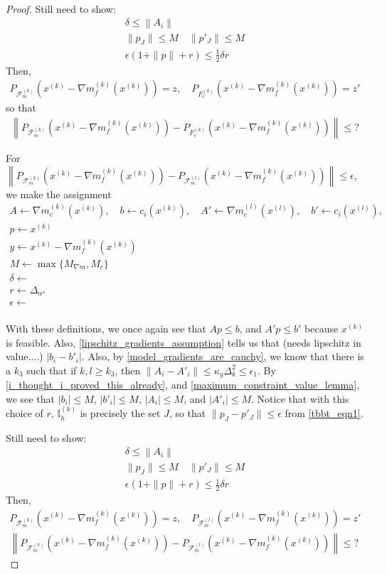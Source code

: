 \documentclass{article}
\theoremstyle{case}
\numberwithin{theorem}{subsection}
\newcommand{\dk}{\Delta_k}
\newcommand{\feasiblek}{{\mathcal F_m^{(k)}}}
\newcommand{\feasiblel}{{\mathcal F_m^{(l)}}}
\newcommand{\gk}{{\nabla m_f^{(k)}\left(\xk\right)}}
\newcommand{\minangledelta}{{\Delta_{\alpha^{\star}}}}
\newcommand{\xk}{x^{(k)}}
\newcommand{\xl}{{x^{(l)}}}
\newcommand{\truefeasiblek}{{F_c^{(k)}}}
\newcommand{\maxmodelgrad}{{M_{\nabla m}}}
\newcommand{\activeindicesk}{{ \mathbb I_h^{(k)} }}
\newcommand{\modeljack}{{ \nabla m^{(k)}_{c}\left(\xk\right) }}
\newcommand{\modeljacl}{{ \nabla m^{(l)}_{c}\left(\xl\right) }}
\begin{document}
\begin{proof}
\color{red}
Still need to show:
\begin{align*}
\delta \le \left\|A_i\right\| \\
\|p_J\| \le M \quad \|p'_J\| \le M \\
\epsilon\left(1 + \|p\| + r\right) \le \frac 1 2 \delta r
\end{align*}
\color{black}
Then, 
\begin{align*}
P_{\feasiblek}\left(\xk - \gk\right) = z, \quad
P_{\truefeasiblek}\left(\xk - \gk\right) = z'
\end{align*}
so that
\begin{align*}
\left\|P_{\feasiblek}\left(\xk - \gk\right) - P_{\truefeasiblek}\left(\xk - \gk\right) \right\| \le ?
\end{align*}


For 
$\left\| P_{\feasiblek}\left(\xk - \gk\right) - P_{\feasiblel}\left(\xk - \gk\right) \right\| \le \epsilon$,
we make the assignment
\begin{align*}
A			\gets \modeljack, \quad
b			\gets c_i\left(\xk\right), \quad
A'			\gets \modeljacl, \quad
b'			\gets c_i\left(\xl\right), \\
p			\gets \xk \\
y			\gets \xk - \gk \\
M			\gets \max\{\maxmodelgrad, M_c\}\\
\delta		\gets \\
r			\gets \minangledelta \\
\epsilon	\gets \\
\end{align*}

With these definitions, we once again see that $Ap \le b$, and $A'p \le b'$ because $\xk$ is feasible.
\color{red}
Also, \cref{lipschitz_gradients_assumption} tells us that (needs lipschitz in value....)
$|b_i - b'_i|$.
\color{black}
Also, by \cref{model_gradients_are_cauchy}, we know that there is a $k_3$ such that if $k, l \ge k_3$, then $\left\|A_i - A'_i \right\| \le \kappa_g \dk^2 \le \epsilon_1$.
By \cref{i_thought_i_proved_this_already}, and \cref{maximum_constraint_value_lemma}, we see that
$\left|b_i\right| \le M $, $\left|b'_i\right| \le M$,
$\left|A_i\right| \le M $, and $\left|A'_i\right| \le M$.
Notice that with this choice of $r$, $\activeindicesk$ is precisely the set $J$,
so that $\|p_J - p'_J\| \le \epsilon$ from \cref{tbbt_eqn1}.

\color{red}
Still need to show:
\begin{align*}
\delta \le \left\|A_i\right\| \\
\|p_J\| \le M \quad \|p'_J\| \le M \\
\epsilon\left(1 + \|p\| + r\right) \le \frac 1 2 \delta r
\end{align*}
\color{black}
Then, 
\begin{align*}
P_{\feasiblek}\left(\xk - \gk\right) = z, \quad
P_{\feasiblel}\left(\xk - \gk\right) = z' \\
\left\|P_{\feasiblek}\left(\xk - \gk\right) - P_{\feasiblel}\left(\xk - \gk\right) \right\| \le ?
\end{align*}




\end{proof}
\end{document}
